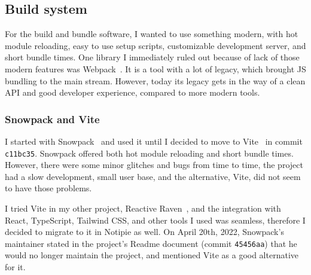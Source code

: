 \subsection{Build system}\label{sec:build-system}

For the build and bundle software,
I wanted to use something modern,
with hot module reloading,
easy to use setup scripts,
customizable development server,
and short bundle times.
One library I immediately ruled out
because of lack of those modern features
was Webpack~\cite{koppers_webpack_2022}.
It is a tool with a lot of legacy,
which brought JS bundling to the main stream.
However, today its legacy gets in the way
of a clean API and good developer experience,
compared to more modern tools.

\subsubsection{Snowpack and Vite}\label{sec:snowpack-and-vite}

I started with Snowpack~\cite{schott_snowpack_2021}
and used it until I decided to move to Vite~\cite{you_vite_2022}
in commit \texttt{c11bc35}.
Snowpack offered both hot module reloading and short bundle times.
However, there were some minor glitches and bugs from time to time,
the project had a slow development,
small user base,
and the alternative, Vite,
did not seem to have those problems.

I tried Vite in my other project,
Reactive Raven~\cite{sewera_reactive_2022},
and the integration with
React,
TypeScript,
Tailwind CSS,
and other tools I used was seamless,
therefore I decided to migrate to it in Notipie as well.
On April 20th, 2022,
Snowpack's maintainer stated in the project's Readme document
(commit \texttt{45456aa})
that he would no longer maintain the project,
and mentioned Vite as a good alternative for it.

